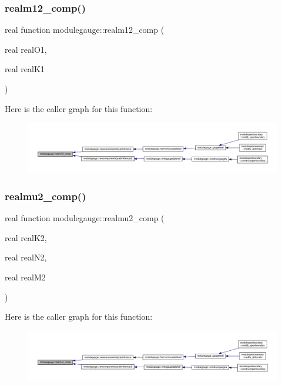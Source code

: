 \subsubsection{\texorpdfstring{realm12\+\_\+comp()}{realm12\_comp()}}
{\footnotesize\ttfamily real function modulegauge\+::realm12\+\_\+comp (\begin{DoxyParamCaption}\item[{real}]{real\+O1,  }\item[{real}]{real\+K1 }\end{DoxyParamCaption})\hspace{0.3cm}{\ttfamily [private]}}

Here is the caller graph for this function\+:\nopagebreak
\begin{figure}[H]
\begin{center}
\leavevmode
\includegraphics[width=350pt]{namespacemodulegauge_ae46da4813d3e3f271dc78267bee39db6_icgraph}
\end{center}
\end{figure}
\mbox{\label{namespacemodulegauge_aba58a8476e1ed7afa1d32b6ec5119be3}} 
\subsubsection{\texorpdfstring{realmu2\+\_\+comp()}{realmu2\_comp()}}
{\footnotesize\ttfamily real function modulegauge\+::realmu2\+\_\+comp (\begin{DoxyParamCaption}\item[{real}]{real\+K2,  }\item[{real}]{real\+N2,  }\item[{real}]{real\+M2 }\end{DoxyParamCaption})\hspace{0.3cm}{\ttfamily [private]}}

Here is the caller graph for this function\+:\nopagebreak
\begin{figure}[H]
\begin{center}
\leavevmode
\includegraphics[width=350pt]{namespacemodulegauge_aba58a8476e1ed7afa1d32b6ec5119be3_icgraph}
\end{center}
\end{figure}
\mbox{\label{namespacemodulegauge_a3fe2f51cb87bda2360ce6930edea74fd}} 
